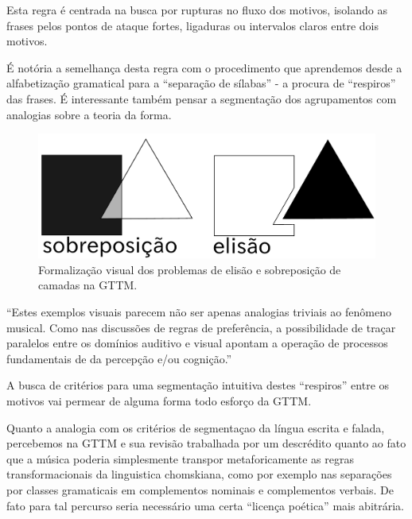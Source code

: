 \documentclass[
	12pt,				%
	openright,			%
	twoside,			%
	a4paper,			%
	english,			%
	french,				%
	spanish,			%
	brazil				%
	]{abntex2}
\begin{document}
Esta regra é centrada na busca por rupturas no fluxo dos motivos, isolando as frases pelos pontos de ataque fortes, ligaduras ou intervalos claros entre dois motivos.  

É notória a semelhança desta regra com o procedimento que aprendemos desde a alfabetização gramatical para a “separação de sílabas” - a procura de “respiros” das frases. É interessante também pensar a segmentação dos agrupamentos com analogias sobre a teoria da forma.\cite{tenney1980temporal}

\begin{figure}[htb]
	\caption{\label{fig_grafico}Formalização visual dos problemas de elisão e sobreposição de camadas na GTTM. \cite[ p.69]{lerdahl1983generative}}
	\begin{center}
	    \includegraphics[scale=0.25]{gestalt/gestalt_elision_overlay.pdf}
	\end{center}
\end{figure}


\begin{citacao}
“Estes exemplos visuais parecem não ser apenas analogias triviais ao fenômeno musical. Como nas discussões de regras de preferência, a possibilidade de traçar paralelos entre os domínios auditivo e visual apontam a operação de processos fundamentais de da percepção e/ou cognição.” \cite{lerdahl1983generative} 
\end{citacao}

A busca de critérios para uma segmentação intuitiva destes “respiros” entre os motivos vai permear de alguma forma todo esforço da GTTM. 

Quanto a analogia com os critérios de segmentaçao da língua escrita e falada, percebemos na GTTM e sua revisão trabalhada por  um descrédito quanto ao fato que a música poderia simplesmente transpor metaforicamente as regras transformacionais da linguistica chomskiana, como por exemplo nas separações por classes gramaticais em complementos nominais e complementos verbais.  De fato para tal percurso seria necessário uma certa “licença poética” mais abitrária.
\end{document}
